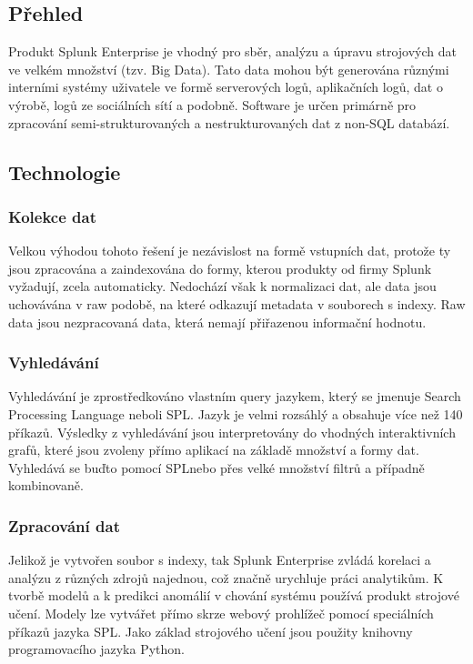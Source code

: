 \documentclass[czech,BP]{thesiskiv}
\begin{document}
\subsection{Přehled}
Produkt Splunk Enterprise je vhodný pro sběr, analýzu a úpravu strojových dat ve velkém množství (tzv. Big Data). Tato data mohou být generována různými interními systémy uživatele ve formě serverových logů, aplikačních logů, dat o výrobě, logů ze sociálních sítí a podobně. Software je určen primárně pro zpracování semi-strukturovaných a nestrukturovaných dat z non-SQL databází.

\subsection{Technologie}
\subsubsection{Kolekce dat}
Velkou výhodou tohoto řešení je nezávislost na formě vstupních dat, protože ty jsou zpracována a zaindexována do formy, kterou produkty od firmy Splunk vyžadují, zcela automaticky. Nedochází však k normalizaci dat, ale data jsou uchovávána v raw podobě, na které odkazují metadata v souborech s indexy. Raw data jsou nezpracovaná data, která nemají přiřazenou informační hodnotu.

\subsubsection{Vyhledávání}
Vyhledávání je zprostředkováno vlastním query jazykem, který se jmenuje Search Processing Language neboli SPL\texttrademark. Jazyk je velmi rozsáhlý a obsahuje více než 140 příkazů. Výsledky z vyhledávání jsou interpretovány do vhodných interaktivních grafů, které jsou zvoleny přímo aplikací na základě množství a formy dat. Vyhledává se buďto pomocí SPL\texttrademark nebo přes velké množství filtrů a případně kombinovaně. \cite{Operational_intelligence}

\subsubsection{Zpracování dat}
Jelikož je vytvořen soubor s indexy, tak Splunk Enterprise zvládá korelaci a analýzu z různých zdrojů najednou, což značně urychluje práci analytikům. K tvorbě modelů a k predikci anomálií v chování systému používá produkt strojové učení. Modely lze vytvářet přímo skrze webový prohlížeč pomocí speciálních příkazů jazyka SPL\texttrademark. Jako základ strojového učení jsou použity knihovny programovacího jazyka Python. \cite{MachineLearning}
\end{document}
